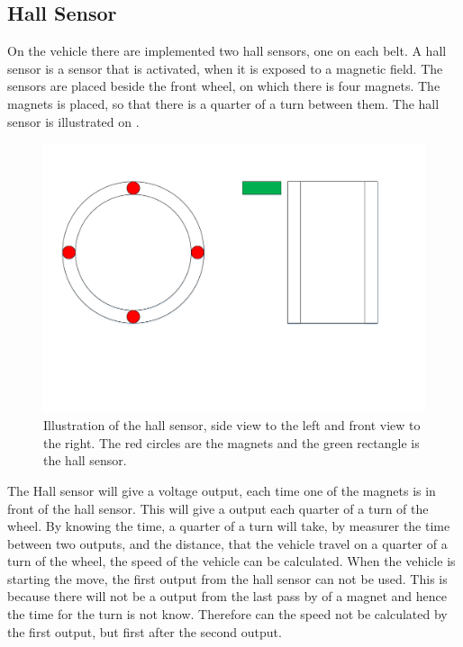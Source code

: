 \subsection{Hall Sensor}

On the vehicle there are implemented two hall sensors, one on each belt. A hall sensor is a sensor that is activated, when it is exposed to a magnetic field. The sensors are placed beside the front wheel, on which there is four magnets. The magnets is placed, so that there is a quarter of a turn between them. The hall sensor is illustrated on .

 \begin{figure}[H]
	\centering
	\includegraphics[scale=0.5]{figures/HallSensorSide_Forward_view.pdf}
	\caption{Illustration of the hall sensor, side view to the left and front view to the right. The red circles are the magnets and the green rectangle is the hall sensor.}
	\label{HallSensor}
\end{figure}

The Hall sensor will give a voltage output, each time one of the magnets is in front of the hall sensor. This will give a output each quarter of a turn of the wheel. By knowing the time, a quarter of a turn will take, by measurer the time between two outputs, and the distance, that the vehicle travel on a quarter of a turn of the wheel, the speed of the vehicle can be calculated.
When the vehicle is starting the move, the first output from the hall sensor can not be used. This is because there will not be a output from the last pass by of a magnet and hence the time for the turn is not know. Therefore can the speed not be calculated by the first output, but first after the second output.